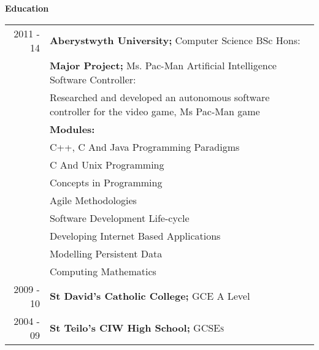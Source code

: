 \documentclass[a4paper,12pt,final,sans]{memoir}
\begin{document}
\textbf{\textsf{\color{head} \large{Education} }}\\[-1.5em]
\begin{longtable}{r p{16cm}}
2011 - 14 & \textbf{\textsf{\color{head} Aberystwyth University;}} Computer Science BSc Hons:\\[0.3em]
		& \textbf{\color{subhead} Major Project;} Ms. Pac-Man Artificial Intelligence Software Controller:\\
		& Researched and developed an autonomous software controller for the video game, Ms Pac-Man game \\[0.2em]

		& \textbf{\color{subhead} Modules:}\\ 
		& \textsc{C++}, C And Java Programming Paradigms
		{}\\

		& C And Unix Programming
		{}\\

		& Concepts in Programming
		{}\\

		& Agile Methodologies
		{}\\

		& Software Development Life-cycle
		{}\\

		& Developing Internet Based Applications
		{}\\

		& Modelling Persistent Data
		{}\\

		& Computing Mathematics
		{}\\[0.5em]

2009 - 10 & \textbf{\textsf{\color{head} St David's Catholic College;}} GCE A Level\\[0.3em]

2004 - 09 & \textbf{\textsf{\color{head} St Teilo's CIW High School;}} \textsc{GCSEs}
\end{longtable}

\vspace{1mm}
%
\end{document}
